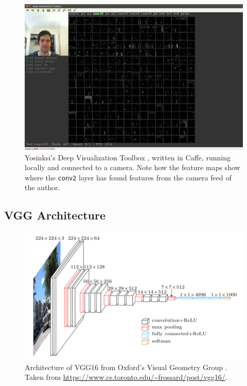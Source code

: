 \documentclass[hidelinks]{article}
\begin{document}
\begin{figure}[h]
  \centering
  \includegraphics[scale=0.25]{deepviz}
  \caption{Yosinksi's Deep Visualization Toolbox \cite{Yosinski2015}, written in Caffe, running locally and connected to a camera. Note how the feature maps show where the \texttt{conv2} layer has found features from the camera feed of the author.}
  \label{fig:deepviz}
\end{figure}

\subsection{VGG Architecture}

\begin{figure}[H]
  \centering
  \includegraphics[scale=0.84]{vgg16}
  \caption{Architecture of VGG16 from Oxford's Visual Geometry Group \cite{Simonyan2015}. Taken from \newline \url{https://www.cs.toronto.edu/~frossard/post/vgg16/}.}
  \label{fig:vgg16}
\end{figure}
\end{document}
